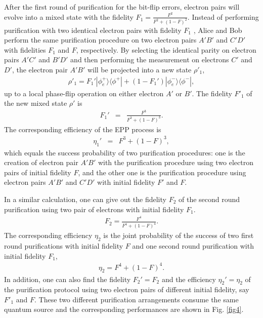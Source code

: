 \documentclass[aps,graphicx,twocolumn]{revtex4}%
\begin{document}
After the first round of purification for the bit-flip errors, electron pairs will evolve into a mixed state with the fidelity $F_1=\frac{F^{2}}{F^{2}+(1-F)^{2}}$. Instead of performing purification with two identical electron pairs with fidelity $F_1$ \cite{EPPpan01,EPPpan2,EPPSheng1,EPPpdeng1}, Alice and Bob perform the same purification procedure on two electron pairs ${A'B'}$ and ${C'D'}$ with fidelities $F_1$ and $F$, respectively.
By selecting  the identical parity on electron pairs ${A'C'}$ and ${B'D'}$ and then performing the measurement on electrons ${C'}$ and ${D'}$, the electron pair ${A'B'}$ will be projected into a new state $\rho'_1$,
\begin{equation}\label{rho3}
  \begin{split}
  \rho'_1=F_1'|\phi^+_e\rangle\langle\phi^+|+(1-F_1')|\phi^-_e\rangle\langle\phi^-|,
  \end{split}
\end{equation}
up to a local phase-flip operation on either electron ${A'}$ or ${B'}$. The fidelity $F'_1$ of the new mixed state $\rho'$ is
\begin{eqnarray}
  F_1' &=& \frac{F^3}{F^3+(1-F)^3}.
\end{eqnarray}
The corresponding efficiency of the EPP process is
\begin{eqnarray}
  \eta_1' &=& F^3+(1-F)^3,
\end{eqnarray}
which equals the success probability of two purification procedures: one is the creation of electron pair ${A'B'}$ with the purification procedure using two electron pairs of initial fidelity $F$, and the other one is the purification procedure using  electron pairs ${A'B'}$ and  ${C'D'}$ with initial fidelity $F'$ and $F$.


In a similar calculation, one can give out the fidelity
$F_2$ of the second round purification using two pair of electrons
with initial fidelity $F_1$.
\begin{eqnarray}
  F_2 = \frac{F^4}{F^4+(1-F)^4}.
\end{eqnarray}
The corresponding efficiency $\eta_2$ is the joint probability of
the success of two first round purifications with initial fidelity
$F$ and one second round purification with initial fidelity $F_1$,
\begin{eqnarray}
   \eta_2= F^4+(1-F)^4.
\end{eqnarray}
In addition, one can also find the fidelity $F_2'=F_2$ and the efficiency $\eta_2'=\eta_2$ of the purification protocol using two electron pairs of different initial fidelity, say $F'_1$ and $F$.  These two different purification arrangements consume the same quantum source and the corresponding performances are shown in Fig. \ref{fig4}.
\end{document}
